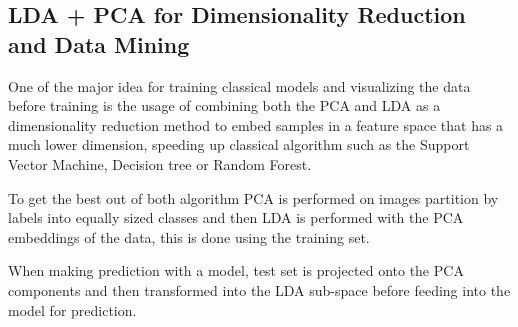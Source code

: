 \documentclass{article}
\begin{document}
    \subsection*{LDA + PCA for Dimensionality Reduction and Data Mining}
        \hspace{1.1em}
        One of the major idea for training classical models and visualizing the data before training is the usage of combining both the PCA and LDA as a dimensionality reduction method to embed samples in a feature space that has a much lower dimension, speeding up classical algorithm such as the Support Vector Machine, Decision tree or Random Forest. 
        \par
        To get the best out of both algorithm PCA is performed on images partition by labels into equally sized classes and then LDA is performed with the PCA embeddings of the data, this is done using the training set. 
        \par
        When making prediction with a model, test set is projected onto the PCA components and then transformed into the LDA sub-space before feeding into the model for prediction.
\end{document}
